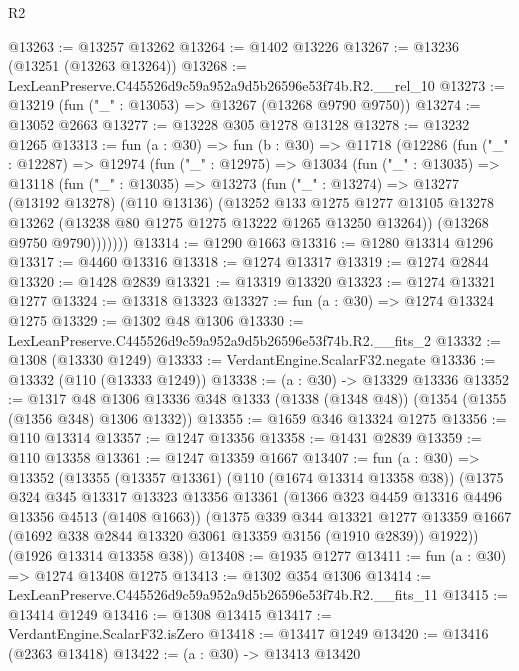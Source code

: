 \begin{lexlean}{R2}
\begin{coremodule}
@13263 := @13257 @13262
@13264 := @1402 @13226
@13267 := @13236 (@13251 (@13263 @13264))
@13268 := LexLeanPreserve.C445526d9c59a952a9d5b26596e53f74b.R2.__rel_10
@13273 := @13219 (fun ("_" : @13053) => @13267 (@13268 @9790 @9750))
@13274 := @13052 @2663
@13277 := @13228 @305 @1278 @13128
@13278 := @13232 @1265
@13313 := fun (a : @30) =>
  fun (b : @30) =>
  @11718
    (@12286
      (fun ("_" : @12287) =>
      @12974
        (fun ("_" : @12975) =>
        @13034
          (fun ("_" : @13035) =>
          @13118
            (fun ("_" : @13035) =>
            @13273
              (fun ("_" : @13274) =>
              @13277
                (@13192 @13278)
                (@110 @13136)
                (@13252
                  @133
                  @1275
                  @1277
                  @13105
                  @13278
                  @13262
                  (@13238 @80 @1275 @1275 @13222 @1265 @13250 @13264))
                (@13268 @9750 @9790)))))))
@13314 := @1290 @1663
@13316 := @1280 @13314 @1296
@13317 := @4460 @13316
@13318 := @1274 @13317
@13319 := @1274 @2844
@13320 := @1428 @2839
@13321 := @13319 @13320
@13323 := @1274 @13321 @1277
@13324 := @13318 @13323
@13327 := fun (a : @30) => @1274 @13324 @1275
@13329 := @1302 @48 @1306
@13330 := LexLeanPreserve.C445526d9c59a952a9d5b26596e53f74b.R2.__fits_2
@13332 := @1308 (@13330 @1249)
@13333 := VerdantEngine.ScalarF32.negate
@13336 := @13332 (@110 (@13333 @1249))
@13338 := (a : @30) -> @13329 @13336
@13352 := @1317
    @48
    @1306
    @13336
    @348
    @1333
    (@1338 (@1348 @48))
    (@1354 (@1355 (@1356 @348) @1306 @1332))
@13355 := @1659 @346 @13324 @1275
@13356 := @110 @13314
@13357 := @1247 @13356
@13358 := @1431 @2839
@13359 := @110 @13358
@13361 := @1247 @13359 @1667
@13407 := fun (a : @30) =>
  @13352
    (@13355
      (@13357 @13361)
      (@110 (@1674 @13314 @13358 @38))
      (@1375
        @324
        @345
        @13317
        @13323
        @13356
        @13361
        (@1366 @323 @4459 @13316 @4496 @13356 @4513 (@1408 @1663))
        (@1375
          @339
          @344
          @13321
          @1277
          @13359
          @1667
          (@1692 @338 @2844 @13320 @3061 @13359 @3156 (@1910 @2839))
          @1922))
      (@1926 @13314 @13358 @38))
@13408 := @1935 @1277
@13411 := fun (a : @30) => @1274 @13408 @1275
@13413 := @1302 @354 @1306
@13414 := LexLeanPreserve.C445526d9c59a952a9d5b26596e53f74b.R2.__fits_11
@13415 := @13414 @1249
@13416 := @1308 @13415
@13417 := VerdantEngine.ScalarF32.isZero
@13418 := @13417 @1249
@13420 := @13416 (@2363 @13418)
@13422 := (a : @30) -> @13413 @13420

\end{coremodule}
\end{lexlean}
